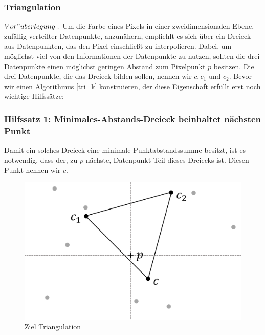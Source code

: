 \documentclass[a4paper]{extarticle}
\begin{document}
    \subsubsection{Triangulation}

    $Vor"uberlegung:$ Um die Farbe eines Pixels in einer zweidimensionalen Ebene, zufällig verteilter
    Datenpunkte, anzunähern, empfiehlt es sich über ein Dreieck aus Datenpunkten, das den Pixel 
    einschließt zu interpolieren. Dabei, um möglichst viel von den Informationen der Datenpunkte 
    zu nutzen, sollten die drei Datenpunkte einen möglichst geringen Abstand zum Pixelpunkt $p$ 
    besitzen. Die drei Datenpunkte, die das Dreieck bilden sollen, nennen wir $c, c_1$ und $c_2$.
    Bevor wir einen Algorithmus \ref{tri_k} konstruieren, der diese Eigenschaft erfüllt erst noch 
    wichtige Hilfssätze:

    \subsubsection{Hilfssatz 1: Minimales-Abstands-Dreieck beinhaltet nächsten Punkt} \label{tri_hs1}
    Damit ein solches Dreieck eine minimale Punktabstandssumme besitzt,
    ist es notwendig, dass der, zu $p$ nächste, Datenpunkt Teil dieses Dreiecks ist. Diesen Punkt 
    nennen wir $c$.

    \begin{figure}[!ht]
        \centering	
        \includegraphics[scale=0.10]{bilder/tri_1.pdf}
        \caption{Ziel Triangulation}
        \label{fig:triangulation_1}
    \end{figure}
\end{document}
